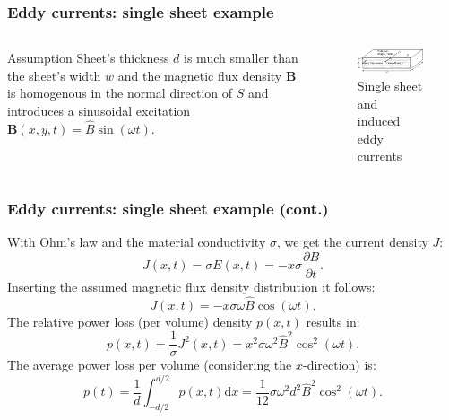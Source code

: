 \begin{frame}
	\frametitle{Eddy currents: single sheet example}
    \begin{columns}
		\begin{column}{0.5\textwidth}
            \begin{varblock}{Assumption}
                Sheet's thickness $d$ is much smaller than the sheet's width $w$ and the magnetic flux density $\bm{B}$ is homogenous in the normal direction of $S$ and introduces a sinusoidal excitation $\bm{B}(x,y,t) = \hat{B}\sin(\omega t)$.
             \end{varblock}
        \end{column}
        \hfill
		\begin{column}{0.49\textwidth}
			\begin{figure}
				\centering
				\includegraphics[height=0.3\textheight]{fig/lec02/Eddy_currents_single_sheet.pdf}
				\caption{Single sheet and induced eddy currents}
			\end{figure}
		\end{column}
		\end{columns}
\end{frame}

\begin{frame}
	\frametitle{Eddy currents: single sheet example (cont.)}
    With Ohm's law and the material conductivity $\sigma$, we get the current density $J$:
    $$
        J(x,t) = \sigma E(x,t) = -x\sigma\frac{\partial B}{\partial t}.
    $$\pause 
    Inserting the assumed magnetic flux density distribution it follows:
    $$
        J(x,t) = -x\sigma\omega\hat{B}\cos(\omega t).
    $$\pause
    The relative power loss (per volume) density $p(x,t)$ results in:
    $$
    p(x,t) = \frac{1}{\sigma} J^2(x,t) = x^2\sigma\omega^2\hat{B}^2\cos^2(\omega t).
    $$\pause
    The average power loss per volume (considering the $x$-direction) is:
    $$
    p(t) = \frac{1}{d} \int_{-d/2}^{d/2} p(x,t) \mathrm{d}x = \frac{1}{12}\sigma\omega^2 d^2 \hat{B}^2\cos^2(\omega t).
    $$
\end{frame}


